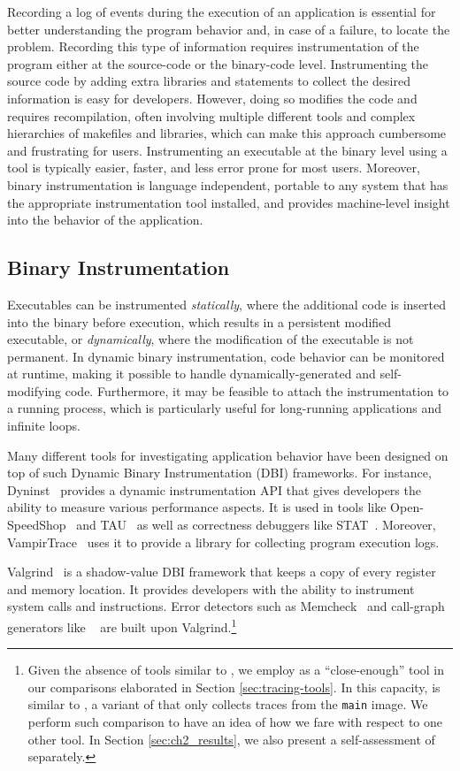 Recording a log of events during the execution of an application is essential for better understanding the program behavior and, in case of a failure, to locate the problem.
%
Recording this type of information requires instrumentation of the program either at the source-code or the binary-code level.
%
Instrumenting the source code by adding extra libraries and statements to collect the desired information is easy for developers.
%
However, doing so modifies the code and requires recompilation, often involving multiple different tools and complex hierarchies of makefiles and libraries, which can make this approach cumbersome and frustrating for users.
%
Instrumenting an executable at the binary level using a tool is typically easier, faster, and less error prone for most users.
%
Moreover, binary instrumentation is language independent, portable to any system that has the appropriate instrumentation tool installed, and provides machine-level insight into the behavior of the application.
%

\subsection{Binary Instrumentation}
Executables can be instrumented \textit{statically}, where the additional code is inserted into the binary before execution, which results in a persistent modified executable, or \textit{dynamically}, where the modification of the executable is not permanent. In dynamic binary instrumentation, code behavior can be monitored at runtime, making it possible to handle dynamically-generated and self-modifying code. Furthermore, it may be feasible to attach the instrumentation to a running process, which is particularly useful for long-running applications and infinite loops.

Many different tools for investigating application behavior have been designed on top of such Dynamic Binary Instrumentation (DBI) frameworks. For instance, Dyninst~\cite{dyninst} provides a dynamic instrumentation API that gives developers the ability to measure various performance aspects. It is used in tools like Open-SpeedShop~\cite{openss} and TAU~\cite{tau} as well as correctness debuggers like STAT~\cite{stat}. Moreover, VampirTrace~\cite{vampirt} uses it to provide a library for collecting program execution logs.

Valgrind~\cite{valgrind} is a shadow-value DBI framework that keeps a copy of every register and memory location. It provides developers with the ability to instrument system calls and instructions. Error detectors such as Memcheck~\cite{memcheck} and call-graph generators like \callgrind~\cite{callgrind} are built upon Valgrind.\footnote{Given the absence of tools similar to \parlot, we employ \callgrind
 as a ``close-enough'' tool in our comparisons elaborated in Section \ref{sec:tracing-tools}.
 In this capacity, \callgrind is similar to \parlotm, a variant of \parlot that only collects
 traces from the {\tt main} image. We perform such comparison to have an idea of how we fare
 with respect to one other tool. In Section \ref{sec:ch2_results}, we also present a self-assessment of \parlot separately.}


